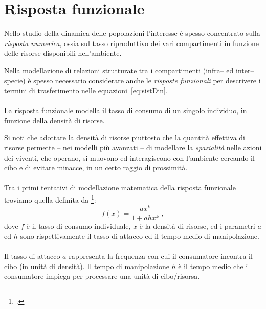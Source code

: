 \section{Risposta funzionale}
\label{sec:rispFunz}
Nello studio della dinamica delle popolazioni l'interesse è spesso concentrato sulla \emph{risposta numerica}, ossia
sul tasso riproduttivo dei vari compartimenti in funzione delle risorse disponibili nell'ambiente.

Nella modellazione di relazioni strutturate tra i compartimenti (infra-- ed inter-- specie) è spesso necessario
considerare anche le \emph{risposte funzionali} per descrivere i termini di trasferimento nelle equazioni~\eqref{eq:sistDin}.

\paragraph{}
La risposta funzionale modella il tasso di consumo di un singolo individuo, in funzione della densità di risorse.

Si noti che adottare la densità di risorse piuttosto che la quantità effettiva di risorse permette --
nei modelli più avanzati -- di modellare la \emph{spazialità} nelle azioni dei viventi, che operano, si muovono
ed interagiscono con l'ambiente cercando il cibo e di evitare minacce, in un certo raggio di prossimità.

\paragraph{}
Tra i primi tentativi di modellazione matematica della risposta funzionale troviamo quella definita da
\citeauthor{holling59}\footcite{holling59}:
\begin{equation}
    f(x) = \frac{a x^k}{1+ a h x^k} \; ,
    \label{eq:holling}
\end{equation}
dove $f$ è il tasso di consumo individuale, $x$ è la densità di risorse, ed i parametri $a$ ed $h$ sono rispettivamente
il tasso di attacco ed il tempo medio di manipolazione.

\paragraph{}
Il tasso di attacco $a$ rappresenta la frequenza con cui il consumatore incontra il cibo (in unità di densità).
Il tempo di manipolazione $h$ è il tempo medio che il consumatore impiega per processare una unità di cibo/risorsa.

